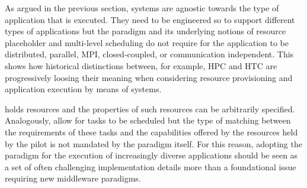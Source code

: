 \documentclass{sig-alternate}
\begin{document}


 As argued in the previous section, \pilot systems are agnostic towards
the type of application that is executed. They need to be engineered so to
support different types of applications but the \pilot paradigm and its
underlying notions of resource placeholder and multi-level scheduling do not
require for the application to be distributed, parallel, MPI, closed-coupled, or
communication independent. This shows how historical distinctions between, for
example, HPC and HTC are progressively loosing their meaning when considering
resource provisioning and application execution by means of \pilot systems.

\pilots holds resources and the properties of such resources can be arbitrarily
specified. Analogously, \pilots allow for tasks to be scheduled but the type of
matching between the requirements of these tasks and the capabilities offered by
the resources held by the pilot is not mandated by the \pilot paradigm itself.
For this reason, adopting the \pilot paradigm for the execution of increasingly
diverse applications should be seen as a set of often challenging implementation
details more than a foundational issue requiring new middleware paradigms.


\end{document}
